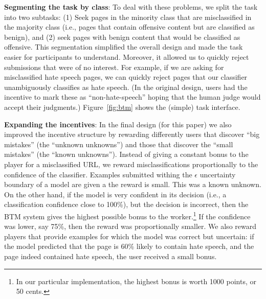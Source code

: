 \textbf{Segmenting the task by class}: To deal with these problems, we split the task into two subtasks: (1) Seek pages in the minority class that are misclassified in the majority class (i.e., pages that contain offensive content but are classified as benign), and (2) seek pages with benign content that would be classified as offensive. This segmentation simplified the overall design and made the task easier for participants to understand.  Moreover, it allowed us to quickly reject submissions that were of no interest.  For example, if we are asking for misclassified hate speech pages, we can quickly reject pages that our classifier unambiguously classifies as hate speech. (In the original design, users had the incentive to mark these as ``non-hate-speech'' hoping that the human judge would accept their judgments.) Figure~\ref{fig:btm} shows the (simple) task interface.

\textbf{Expanding the incentives}: In the final design (for this paper) we also improved the incentive structure by rewarding differently users that discover ``big mistakes'' (the ``unknown unknowns'') and those that discover the ``small mistakes'' (the ``known unknowns''). Instead of giving a constant bonus to the player for a misclassified URL, we reward misclassifications proportionally to the confidence of the classifier. 
Examples submitted withing the $\epsilon$ uncertainty boundary of a model are given a 
the reward is small.  This was a known unknown.
On the other hand, if the model is very confident in its decision (i.e., a classification confidence close to 100\%), but the decision is incorrect, then the BTM system gives the highest possible bonus to the worker.\footnote{In our particular implementation, the highest bonus is worth 1000 points, or 50 cents.} If the confidence was lower, say 75\%, then the reward was proportionally smaller. We also reward players that provide examples for which the model was correct but uncertain: if the model predicted that the page is 60\% likely to contain hate speech, and the page indeed contained hate speech, the user received a small bonus.


